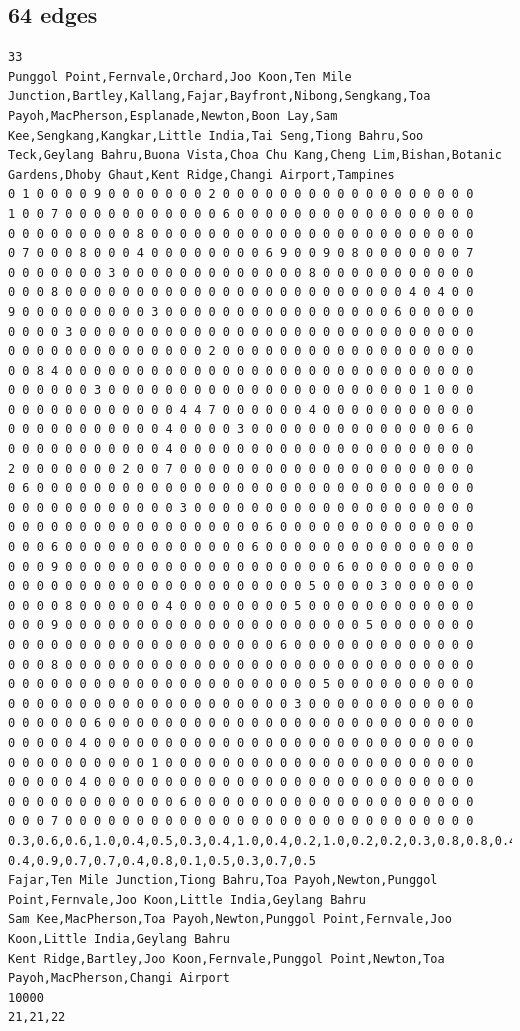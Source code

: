 \documentclass[a4paper,12pt]{article}
\begin{document}
\subsection*{64 edges}
\begin{verbatim}
33
Punggol Point,Fernvale,Orchard,Joo Koon,Ten Mile Junction,Bartley,Kallang,Fajar,Bayfront,Nibong,Sengkang,Toa Payoh,MacPherson,Esplanade,Newton,Boon Lay,Sam Kee,Sengkang,Kangkar,Little India,Tai Seng,Tiong Bahru,Soo Teck,Geylang Bahru,Buona Vista,Choa Chu Kang,Cheng Lim,Bishan,Botanic Gardens,Dhoby Ghaut,Kent Ridge,Changi Airport,Tampines
0 1 0 0 0 0 9 0 0 0 0 0 0 0 2 0 0 0 0 0 0 0 0 0 0 0 0 0 0 0 0 0 0
1 0 0 7 0 0 0 0 0 0 0 0 0 0 0 6 0 0 0 0 0 0 0 0 0 0 0 0 0 0 0 0 0
0 0 0 0 0 0 0 0 0 8 0 0 0 0 0 0 0 0 0 0 0 0 0 0 0 0 0 0 0 0 0 0 0
0 7 0 0 0 8 0 0 0 4 0 0 0 0 0 0 0 0 6 9 0 0 9 0 8 0 0 0 0 0 0 0 7
0 0 0 0 0 0 0 3 0 0 0 0 0 0 0 0 0 0 0 0 0 8 0 0 0 0 0 0 0 0 0 0 0
0 0 0 8 0 0 0 0 0 0 0 0 0 0 0 0 0 0 0 0 0 0 0 0 0 0 0 0 4 0 4 0 0
9 0 0 0 0 0 0 0 0 0 3 0 0 0 0 0 0 0 0 0 0 0 0 0 0 0 0 6 0 0 0 0 0
0 0 0 0 3 0 0 0 0 0 0 0 0 0 0 0 0 0 0 0 0 0 0 0 0 0 0 0 0 0 0 0 0
0 0 0 0 0 0 0 0 0 0 0 0 0 0 2 0 0 0 0 0 0 0 0 0 0 0 0 0 0 0 0 0 0
0 0 8 4 0 0 0 0 0 0 0 0 0 0 0 0 0 0 0 0 0 0 0 0 0 0 0 0 0 0 0 0 0
0 0 0 0 0 0 3 0 0 0 0 0 0 0 0 0 0 0 0 0 0 0 0 0 0 0 0 0 0 1 0 0 0
0 0 0 0 0 0 0 0 0 0 0 0 4 4 7 0 0 0 0 0 0 4 0 0 0 0 0 0 0 0 0 0 0
0 0 0 0 0 0 0 0 0 0 0 4 0 0 0 0 3 0 0 0 0 0 0 0 0 0 0 0 0 0 0 6 0
0 0 0 0 0 0 0 0 0 0 0 4 0 0 0 0 0 0 0 0 0 0 0 0 0 0 0 0 0 0 0 0 0
2 0 0 0 0 0 0 0 2 0 0 7 0 0 0 0 0 0 0 0 0 0 0 0 0 0 0 0 0 0 0 0 0
0 6 0 0 0 0 0 0 0 0 0 0 0 0 0 0 0 0 0 0 0 0 0 0 0 0 0 0 0 0 0 0 0
0 0 0 0 0 0 0 0 0 0 0 0 3 0 0 0 0 0 0 0 0 0 0 0 0 0 0 0 0 0 0 0 0
0 0 0 0 0 0 0 0 0 0 0 0 0 0 0 0 0 0 6 0 0 0 0 0 0 0 0 0 0 0 0 0 0
0 0 0 6 0 0 0 0 0 0 0 0 0 0 0 0 0 6 0 0 0 0 0 0 0 0 0 0 0 0 0 0 0
0 0 0 9 0 0 0 0 0 0 0 0 0 0 0 0 0 0 0 0 0 0 0 6 0 0 0 0 0 0 0 0 0
0 0 0 0 0 0 0 0 0 0 0 0 0 0 0 0 0 0 0 0 0 5 0 0 0 0 3 0 0 0 0 0 0
0 0 0 0 8 0 0 0 0 0 0 4 0 0 0 0 0 0 0 0 5 0 0 0 0 0 0 0 0 0 0 0 0
0 0 0 9 0 0 0 0 0 0 0 0 0 0 0 0 0 0 0 0 0 0 0 0 0 5 0 0 0 0 0 0 0
0 0 0 0 0 0 0 0 0 0 0 0 0 0 0 0 0 0 0 6 0 0 0 0 0 0 0 0 0 0 0 0 0
0 0 0 8 0 0 0 0 0 0 0 0 0 0 0 0 0 0 0 0 0 0 0 0 0 0 0 0 0 0 0 0 0
0 0 0 0 0 0 0 0 0 0 0 0 0 0 0 0 0 0 0 0 0 0 5 0 0 0 0 0 0 0 0 0 0
0 0 0 0 0 0 0 0 0 0 0 0 0 0 0 0 0 0 0 0 3 0 0 0 0 0 0 0 0 0 0 0 0
0 0 0 0 0 0 6 0 0 0 0 0 0 0 0 0 0 0 0 0 0 0 0 0 0 0 0 0 0 0 0 0 0
0 0 0 0 0 4 0 0 0 0 0 0 0 0 0 0 0 0 0 0 0 0 0 0 0 0 0 0 0 0 0 0 0
0 0 0 0 0 0 0 0 0 0 1 0 0 0 0 0 0 0 0 0 0 0 0 0 0 0 0 0 0 0 0 0 0
0 0 0 0 0 4 0 0 0 0 0 0 0 0 0 0 0 0 0 0 0 0 0 0 0 0 0 0 0 0 0 0 0
0 0 0 0 0 0 0 0 0 0 0 0 6 0 0 0 0 0 0 0 0 0 0 0 0 0 0 0 0 0 0 0 0
0 0 0 7 0 0 0 0 0 0 0 0 0 0 0 0 0 0 0 0 0 0 0 0 0 0 0 0 0 0 0 0 0
0.3,0.6,0.6,1.0,0.4,0.5,0.3,0.4,1.0,0.4,0.2,1.0,0.2,0.2,0.3,0.8,0.8,0.4,0.8,0.8,0.9,0.6, 0.4,0.9,0.7,0.7,0.4,0.8,0.1,0.5,0.3,0.7,0.5
Fajar,Ten Mile Junction,Tiong Bahru,Toa Payoh,Newton,Punggol Point,Fernvale,Joo Koon,Little India,Geylang Bahru
Sam Kee,MacPherson,Toa Payoh,Newton,Punggol Point,Fernvale,Joo Koon,Little India,Geylang Bahru
Kent Ridge,Bartley,Joo Koon,Fernvale,Punggol Point,Newton,Toa Payoh,MacPherson,Changi Airport
10000
21,21,22
\end{verbatim}
\end{document}
